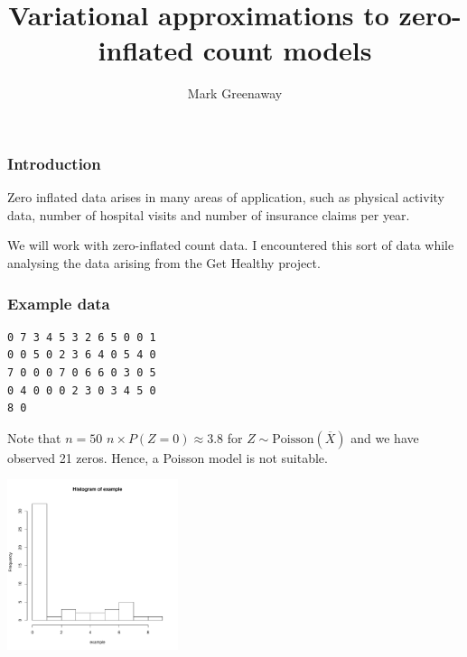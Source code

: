 \documentclass{beamer}
\title{Variational approximations to zero-inflated count models}
\author{Mark Greenaway}
\begin{document}
\begin{frame}
\titlepage
\end{frame}


\begin{frame}
\frametitle{Introduction}
Zero inflated data arises in many areas of application, such as physical
activity data, number of hospital visits and number of insurance claims per
year.

\bigskip 
We will work with zero-inflated count data. I encountered this sort of data while
analysing the data arising from the Get Healthy project.
\end{frame}



\begin{frame}[fragile]
\frametitle{Example data}

\begin{verbatim}
0 7 3 4 5 3 2 6 5 0 0 1
0 0 5 0 2 3 6 4 0 5 4 0
7 0 0 0 7 0 6 6 0 3 0 5
0 4 0 0 0 2 3 0 3 4 5 0
8 0
\end{verbatim}

\noindent Note that $n=50$ 
$n\times P(Z = 0) \approx 3.8$ for $Z\sim\mbox{Poisson}(\overline{X})$
and we have observed 21 zeros. Hence,
a Poisson model is not suitable.

\includegraphics[width=50mm, height=50mm]{code/univariate_data_histogram.pdf}
\end{frame}
\end{document}
